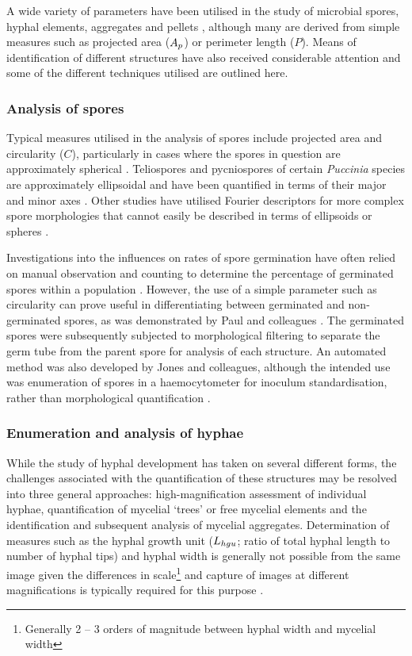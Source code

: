 A wide variety of parameters have been utilised in the study of microbial spores, hyphal elements, aggregates and pellets \cite{pons2000}, although many are derived from simple measures such as projected area ($A_p$) or perimeter length ($P$). Means of identification of different structures have also received considerable attention and some of the different techniques utilised are outlined here.

\subsubsection{Analysis of spores}

Typical measures utilised in the analysis of spores include projected area and circularity ($C$), particularly in cases where the spores in question are approximately spherical \cite{spohr1998}. Teliospores and pycniospores of certain \emph{Puccinia} species are approximately ellipsoidal and have been quantified in terms of their major and minor axes \cite{anikster2005}. Other studies have utilised Fourier descriptors for more complex spore morphologies that cannot easily be described in terms of ellipsoids or spheres \cite{pazoti2005}.

Investigations into the influences on rates of spore germination have often relied on manual observation and counting to determine the percentage of germinated spores within a population \cite{pardo2005, sautour2001}. However, the use of a simple parameter such as circularity can prove useful in differentiating between germinated and non-germinated spores, as was demonstrated by Paul and colleagues \cite{paul1993}. The germinated spores were subsequently subjected to morphological filtering to separate the germ tube from the parent spore for analysis of each structure.  An automated method was also developed by Jones and colleagues, although the intended use was enumeration of spores in a haemocytometer for inoculum standardisation, rather than morphological quantification \cite{jones1992}.

\subsubsection{Enumeration and analysis of hyphae}

While the study of hyphal development has taken on several different forms, the challenges associated with the quantification of these structures may be resolved into three general approaches: high-magnification assessment of individual hyphae, quantification of mycelial \lq trees' or free mycelial elements and the identification and subsequent analysis of mycelial aggregates. Determination of measures such as the hyphal growth unit ($L_{hgu}$; ratio of total hyphal length to number of hyphal tips) and hyphal width is generally not possible from the same image given the differences in scale\footnote{Generally 2 -- 3 orders of magnitude between hyphal width and mycelial width} and capture of images at different magnifications is typically required for this purpose \cite{larralde-corona1997,haack2006}.


